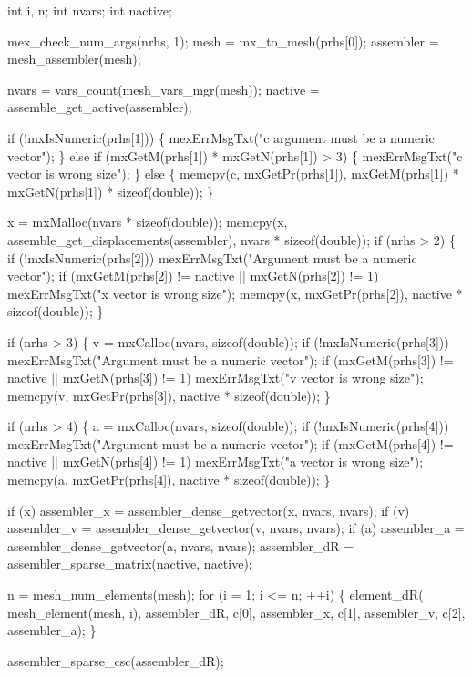     int i, n;
    int nvars;
    int nactive;

    mex_check_num_args(nrhs, 1);
    mesh      = mx_to_mesh(prhs[0]);
    assembler = mesh_assembler(mesh);

    nvars   = vars_count(mesh_vars_mgr(mesh));
    nactive = assemble_get_active(assembler);

    if (!mxIsNumeric(prhs[1])) \{
        mexErrMsgTxt("c argument must be a numeric vector");
    \} else if (mxGetM(prhs[1]) * mxGetN(prhs[1]) > 3) \{
        mexErrMsgTxt("c vector is wrong size");
    \} else \{
        memcpy(c, mxGetPr(prhs[1]), 
               mxGetM(prhs[1]) * mxGetN(prhs[1]) * sizeof(double));
    \}

    x = mxMalloc(nvars * sizeof(double));
    memcpy(x, assemble_get_displacements(assembler), nvars * sizeof(double));
    if (nrhs > 2) \{
        if (!mxIsNumeric(prhs[2]))
            mexErrMsgTxt("Argument must be a numeric vector");
        if (mxGetM(prhs[2]) != nactive || mxGetN(prhs[2]) != 1)
            mexErrMsgTxt("x vector is wrong size");
        memcpy(x, mxGetPr(prhs[2]), nactive * sizeof(double));
    \}

    if (nrhs > 3) \{
        v = mxCalloc(nvars, sizeof(double));
        if (!mxIsNumeric(prhs[3]))
            mexErrMsgTxt("Argument must be a numeric vector");
        if (mxGetM(prhs[3]) != nactive || mxGetN(prhs[3]) != 1)
            mexErrMsgTxt("v vector is wrong size");
        memcpy(v, mxGetPr(prhs[3]), nactive * sizeof(double));
    \}

    if (nrhs > 4) \{
        a = mxCalloc(nvars, sizeof(double));
        if (!mxIsNumeric(prhs[4]))
            mexErrMsgTxt("Argument must be a numeric vector");
        if (mxGetM(prhs[4]) != nactive || mxGetN(prhs[4]) != 1)
            mexErrMsgTxt("a vector is wrong size");
        memcpy(a, mxGetPr(prhs[4]), nactive * sizeof(double));
    \}

    if (x) assembler_x = assembler_dense_getvector(x, nvars, nvars);
    if (v) assembler_v = assembler_dense_getvector(v, nvars, nvars);
    if (a) assembler_a = assembler_dense_getvector(a, nvars, nvars);
    assembler_dR = assembler_sparse_matrix(nactive, nactive);

    n = mesh_num_elements(mesh);
    for (i = 1; i <= n; ++i) \{
        element_dR( mesh_element(mesh, i), assembler_dR, 
                    c[0], assembler_x,
                    c[1], assembler_v,
                    c[2], assembler_a);
    \}

    assembler_sparse_csc(assembler_dR);

